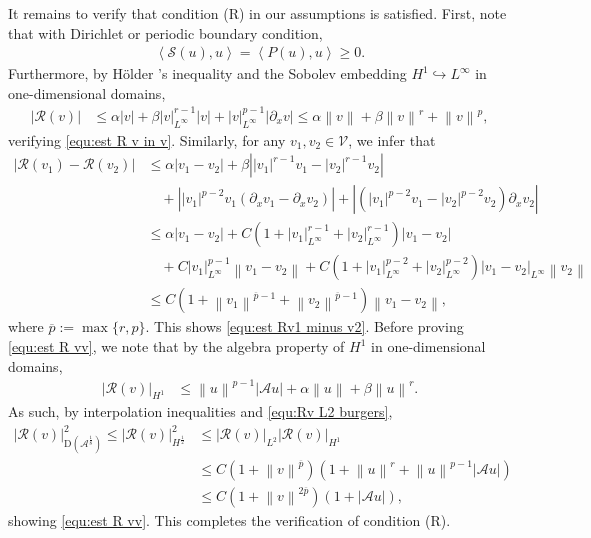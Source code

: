\documentclass[11pt, reqno]{amsart}
\theoremstyle{definition}
\numberwithin{equation}{section}
\newcommand{\norm}[1]{\left\|{#1}\right\|}
\newcommand{\inpro}[2]{\left\langle#1,#2\right\rangle}
\newcommand{\abs}[1]{\left|{#1}\right|}
\begin{document}
It remains to verify that condition (R) in our assumptions is satisfied. First, note that with Dirichlet or periodic boundary condition, 
\begin{align*}
	\inpro{\mathcal{S}(u)}{u}= \inpro{P(u)}{u}\geq 0.
\end{align*}
Furthermore, by H\"older 's inequality and the Sobolev embedding $H^1\hookrightarrow L^\infty$ in one-dimensional domains,
\begin{align}\label{equ:Rv L2 burgers}
	\abs{\mathcal{R}(v)} 
	&\leq
	\alpha \abs{v} + \beta \abs{v}_{L^\infty}^{r-1} \abs{v} + \abs{v}_{L^\infty}^{p-1} \abs{\partial_x v}
	\leq 
	\alpha \norm{v} + \beta \norm{v}^r + \norm{v}^p,
\end{align}
verifying \eqref{equ:est R v in v}. Similarly, for any $v_1,v_2\in \mathcal{V}$, we infer that
\begin{align*}
	\abs{\mathcal{R}(v_1)-\mathcal{R}(v_2)} 
	&\leq 
	\alpha \abs{v_1-v_2} + \beta \abs{|v_1|^{r-1} v_1 - |v_2|^{r-1} v_2} 
	\\
	&\quad
	+
	\abs{|v_1|^{p-2} v_1 (\partial_x v_1-\partial_x v_2)} + 
	\abs{(|v_1|^{p-2} v_1 - |v_2|^{p-2} v_2) \partial_x v_2}
	\\
	&\leq
	\alpha \abs{v_1-v_2} + C\left(1+\abs{v_1}_{L^\infty}^{r-1}+\abs{v_2}_{L^\infty}^{r-1} \right) \abs{v_1-v_2}
	\\
	&\quad
	+
	C \abs{v_1}_{L^\infty}^{p-1} \norm{v_1-v_2} + C\left(1+\abs{v_1}_{L^\infty}^{p-2}+ \abs{v_2}_{L^\infty}^{p-2}\right) \abs{v_1-v_2}_{L^\infty} \norm{v_2}
	\\
	&\leq
	C\left(1+ \norm{v_1}^{\overline{p}-1}+ \norm{v_2}^{\overline{p}-1}\right) \norm{v_1-v_2},
\end{align*}
where $\overline{p}:=\max\{r,p\}$. This shows \eqref{equ:est Rv1 minus v2}. Before proving \eqref{equ:est R vv}, we note that by the algebra property of $H^1$ in one-dimensional domains,
\begin{align*}
	\abs{\mathcal{R}(v)}_{H^1}
	&\leq
	\norm{u}^{p-1} \abs{\mathcal{A}u} + \alpha \norm{u} + \beta \norm{u}^r.
\end{align*}
As such, by interpolation inequalities and \eqref{equ:Rv L2 burgers},
\begin{align*}
	\abs{\mathcal{R}(v)}_{\mathrm{D}(\mathcal{A}^{\frac18})}^2
	\leq
	\abs{\mathcal{R}(v)}_{H^{\frac12}}^2
	&\leq
	\abs{\mathcal{R}(v)}_{L^2} \abs{\mathcal{R}(v)}_{H^1}
	\\
	&\leq
	C\left(1+ \norm{v}^{\overline{p}}\right) \left(1+ \norm{u}^r+ \norm{u}^{p-1} \abs{\mathcal{A}u}\right)
	\\
	&\leq
	C\left(1+ \norm{v}^{2\overline{p}}\right) \left(1+ \abs{\mathcal{A}u}\right),
\end{align*}
showing \eqref{equ:est R vv}. This completes the verification of condition (R).
\end{document}
